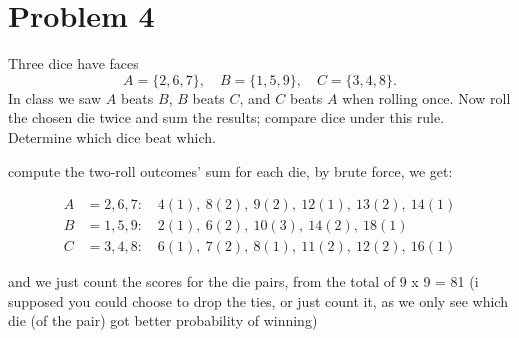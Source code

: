 \vspace{1em}
\hrulefill

\section*{Problem 4}
Three dice have faces
\[
A = \{2,6,7\},\quad B = \{1,5,9\},\quad C = \{3,4,8\}.
\]
In class we saw $A$ beats $B$, $B$ beats $C$, and $C$ beats $A$ when rolling once. Now roll the chosen die twice and sum the results; compare dice under this rule. Determine which dice beat which.

\medskip
\solution

compute the two-roll outcomes' sum for each die, by brute force, we get:

\[
\begin{aligned}
A&={2,6,7}:\quad 4(1),\ 8(2),\ 9(2),\ 12(1),\ 13(2),\ 14(1) \\
B&={1,5,9}:\quad 2(1),\ 6(2),\ 10(3),\ 14(2),\ 18(1) \\
C&={3,4,8}:\quad 6(1),\ 7(2),\ 8(1),\ 11(2),\ 12(2),\ 16(1)
\end{aligned}
\]

and we just count the scores for the die pairs, from the total of 9 x 9 = 81 (i supposed you could choose to drop the ties, or just count it, as we only see which die (of the pair) got better probability of winning)

